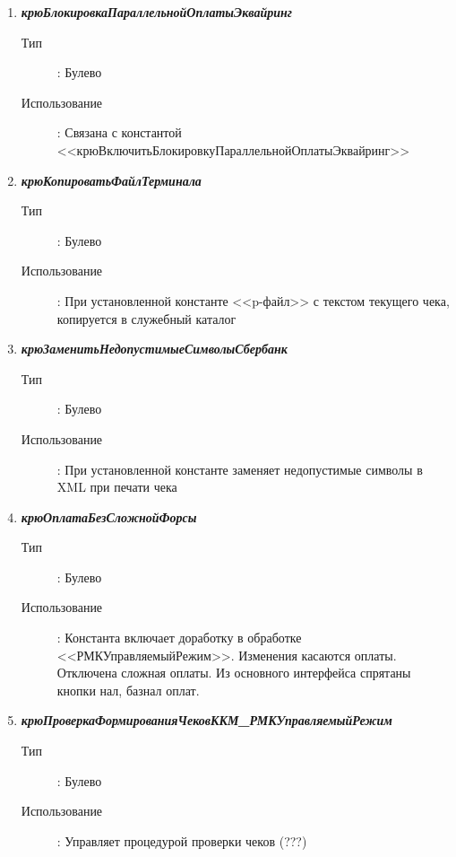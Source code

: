 \begin{enumerate}[label=(\arabic*)]
\vspace{\baselineskip}
\item \textbf{\textit{крюБлокировкаПараллельнойОплатыЭквайринг}}
\begin{description}
    \item[Тип] : Булево
    \item[Использование]: Связана с константой <<крюВключитьБлокировкуПараллельнойОплатыЭквайринг>>
\end{description}


\vspace{\baselineskip}
\item \textbf{\textit{крюКопироватьФайлТерминала}}
\begin{description}
    \item[Тип] : Булево
    \item[Использование]: При установленной константе <<p-файл>> с текстом текущего чека, копируется в служебный каталог
\end{description}

\vspace{\baselineskip}
\item \textbf{\textit{крюЗаменитьНедопустимыеСимволыСбербанк}}
\begin{description}
    \item[Тип] : Булево
    \item[Использование]: При установленной константе заменяет недопустимые символы в XML при печати чека
\end{description}

\vspace{\baselineskip}
\item \textbf{\textit{крюОплатаБезСложнойФорсы}}
\begin{description}
    \item[Тип] : Булево
    \item[Использование]: Константа включает доработку в обработке <<РМКУправляемыйРежим>>.
    Изменения касаются оплаты. Отключена сложная оплаты. Из основного интерфейса спрятаны кнопки нал, базнал оплат.
\end{description}

\vspace{\baselineskip}
\item \textbf{\textit{крюПроверкаФормированияЧековККМ\_РМКУправляемыйРежим}}
\begin{description}
    \item[Тип] : Булево
    \item[Использование]: Управляет процедурой проверки чеков (???)
\end{description}


\end{enumerate}
